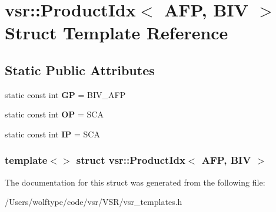 \hypertarget{structvsr_1_1_product_idx_3_01_a_f_p_00_01_b_i_v_01_4}{\section{vsr\-:\-:Product\-Idx$<$ A\-F\-P, B\-I\-V $>$ Struct Template Reference}
\label{structvsr_1_1_product_idx_3_01_a_f_p_00_01_b_i_v_01_4}
}
\subsection*{Static Public Attributes}
\begin{DoxyCompactItemize}
\item 
\hypertarget{structvsr_1_1_product_idx_3_01_a_f_p_00_01_b_i_v_01_4_a4e230efc3af66c0f33307e5e98ac63b2}{static const int {\bfseries G\-P} = B\-I\-V\-\_\-\-A\-F\-P}\label{structvsr_1_1_product_idx_3_01_a_f_p_00_01_b_i_v_01_4_a4e230efc3af66c0f33307e5e98ac63b2}

\item 
\hypertarget{structvsr_1_1_product_idx_3_01_a_f_p_00_01_b_i_v_01_4_a87e9c4f8c92586d67140f0d4b8d3e3e3}{static const int {\bfseries O\-P} = S\-C\-A}\label{structvsr_1_1_product_idx_3_01_a_f_p_00_01_b_i_v_01_4_a87e9c4f8c92586d67140f0d4b8d3e3e3}

\item 
\hypertarget{structvsr_1_1_product_idx_3_01_a_f_p_00_01_b_i_v_01_4_aaa3a786d4c5f6893064e157a0f770a7b}{static const int {\bfseries I\-P} = S\-C\-A}\label{structvsr_1_1_product_idx_3_01_a_f_p_00_01_b_i_v_01_4_aaa3a786d4c5f6893064e157a0f770a7b}

\end{DoxyCompactItemize}
\subsubsection*{template$<$$>$ struct vsr\-::\-Product\-Idx$<$ A\-F\-P, B\-I\-V $>$}



The documentation for this struct was generated from the following file\-:\begin{DoxyCompactItemize}
\item 
/\-Users/wolftype/code/vsr/\-V\-S\-R/vsr\-\_\-templates.\-h\end{DoxyCompactItemize}
